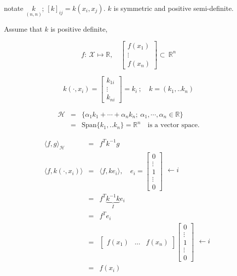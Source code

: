 \documentclass[10pt,portrait]{article}
\begin{document}
notate \(\underset{{(n,n)}}{k}\); \({[k]}_{ij}=k(x_i,x_j)\). \(k\) is
symmetric and positive semi-definite.

Assume that \(k\) is positive definite,

\[f:\ \mathcal{X}\mapsto\mathbb{R},\quad  \begin{bmatrix} f(x_1)\\\vdots\\f(x_n) \end{bmatrix}\subset\ \mathbb{R}^n\]

\[k(\cdot,x_i)=\begin{bmatrix} k_{1i}\\\vdots\\k_{ni} \end{bmatrix}=k_i\ ;\quad k=(k_1,..k_n)\]

\begin{eqnarray*}
\mathcal{H}  &= & \{ \alpha_1k_1+\cdots+\alpha_nk_n;\ \alpha_1,\cdots,\alpha_n\in\mathbb{R}\} \\ & = & \text{Span}\{k_1,..k_n\}=\mathbb{R}^n \quad \text{is a vector space.}
\end{eqnarray*}

\begin{eqnarray*}
\langle f,g\rangle_{\mathcal{H}}&=&f^Tk^{-1}g\\ \langle f,k(\cdot,x_i)\rangle &=& \langle f,ke_i \rangle,\quad e_i=\begin{bmatrix} 0\\\vdots \\1 \\\vdots\\0 \end{bmatrix}\begin{matrix} \\ \\\leftarrow i \\ \\ \\ \end{matrix}\\
&=&f^T\underbrace{k^{-1}k}_{I}e_i\\
&=&f^Te_i\\
&=&\begin{bmatrix} f(x_1)&\hdots&f(x_n) \end{bmatrix}\begin{bmatrix} 0\\\vdots \\1 \\\vdots\\0 \end{bmatrix}\begin{matrix} \\ \\\leftarrow i \\ \\ \\ \end{matrix}\\
&=&f(x_i)
\end{eqnarray*}
\end{document}
